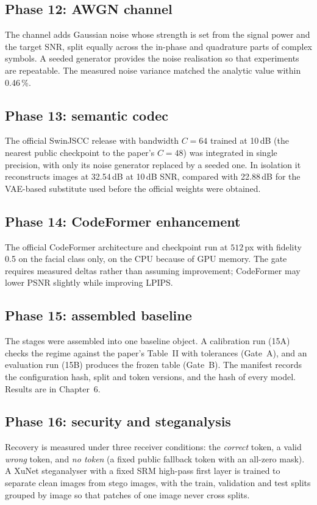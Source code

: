 \subsection{Phase 12: AWGN channel}
The channel adds Gaussian noise whose strength is set from the signal power and the target
SNR, split equally across the in-phase and quadrature parts of complex symbols. A seeded generator
provides the noise realisation so that experiments are repeatable. The measured noise variance
matched the analytic value within 0.46\,\%.

\subsection{Phase 13: semantic codec}
The official SwinJSCC release with bandwidth $C=64$ trained at 10\,dB (the nearest public
checkpoint to the paper's $C=48$) was integrated in single precision, with only its noise
generator replaced by a seeded one. In isolation it reconstructs images at 32.54\,dB at 10\,dB
SNR, compared with 22.88\,dB for the VAE-based substitute used before the official weights were
obtained.

\subsection{Phase 14: CodeFormer enhancement}
The official CodeFormer architecture and checkpoint run at $512$\,px with fidelity 0.5 on the
facial class only, on the CPU because of GPU memory. The gate requires measured deltas rather
than assuming improvement; CodeFormer may lower PSNR slightly while improving LPIPS.

\subsection{Phase 15: assembled baseline}
The stages were assembled into one baseline object. A calibration run (15A) checks the regime
against the paper's Table~II with tolerances (Gate~A), and an evaluation run (15B) produces the
frozen table (Gate~B). The manifest records the configuration hash, split and token versions,
and the hash of every model. Results are in Chapter~6.

\subsection{Phase 16: security and steganalysis}
Recovery is measured under three receiver conditions: the \emph{correct} token, a valid
\emph{wrong} token, and \emph{no token} (a fixed public fallback token with an all-zero mask).
A XuNet steganalyser with a fixed SRM high-pass first layer is trained to separate clean images
from stego images, with the train, validation and test splits grouped by image so that patches of
one image never cross splits.

